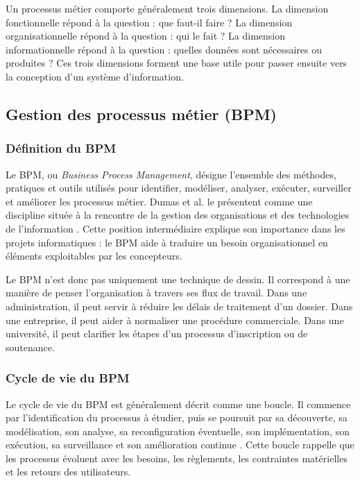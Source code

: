 Un processus métier comporte généralement trois dimensions. La dimension fonctionnelle répond à la question : que faut-il faire ? La dimension organisationnelle répond à la question : qui le fait ? La dimension informationnelle répond à la question : quelles données sont nécessaires ou produites ? Ces trois dimensions forment une base utile pour passer ensuite vers la conception d'un système d'information.

\subsection{Gestion des processus métier (BPM)}

\subsubsection{Définition du BPM}

Le BPM, ou \textit{Business Process Management}, désigne l'ensemble des méthodes, pratiques et outils utilisés pour identifier, modéliser, analyser, exécuter, surveiller et améliorer les processus métier. Dumas et al. le présentent comme une discipline située à la rencontre de la gestion des organisations et des technologies de l'information \cite{dumas2018bpm}. Cette position intermédiaire explique son importance dans les projets informatiques : le BPM aide à traduire un besoin organisationnel en éléments exploitables par les concepteurs.

Le BPM n'est donc pas uniquement une technique de dessin. Il correspond à une manière de penser l'organisation à travers ses flux de travail. Dans une administration, il peut servir à réduire les délais de traitement d'un dossier. Dans une entreprise, il peut aider à normaliser une procédure commerciale. Dans une université, il peut clarifier les étapes d'un processus d'inscription ou de soutenance.

\subsubsection{Cycle de vie du BPM}

Le cycle de vie du BPM est généralement décrit comme une boucle. Il commence par l'identification du processus à étudier, puis se poursuit par sa découverte, sa modélisation, son analyse, sa reconfiguration éventuelle, son implémentation, son exécution, sa surveillance et son amélioration continue \cite{dumas2018bpm,aalst2013}. Cette boucle rappelle que les processus évoluent avec les besoins, les règlements, les contraintes matérielles et les retours des utilisateurs.

